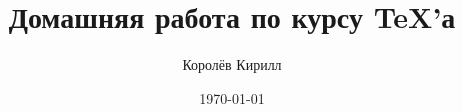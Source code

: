 \documentclass{article}
\title{\bfseries Домашняя работа \textnumero 7 по курсу \TeX'а}
\author{Королёв Кирилл}
\date{\today}
\begin{document}

\pagebreak




\end{document}
